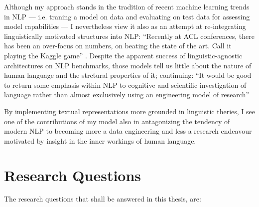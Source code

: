 Although my approach stands in the tradition of recent machine learning trends in NLP --- i.e.
traning a model on data and evaluating on test data for assessing model capabilities --- I
nevertheless view it also as an attempt at re-integrating linguistically motivated structures
into NLP: ``Recently at ACL conferences, there has been an over-focus on numbers, on beating the
state of the art. Call it playing the Kaggle game'' \citep[p.~702]{manning2015computational}.
Despite the apparent success of linguistic-agnostic architectures on NLP benchmarks, those
models tell us little about the nature of human language and the strctural properties of it;
\citeauthor{manning2015computational} continuing: ``It would be good to return some emphasis
within NLP to cognitive and scientific investigation of language rather than almost exclusively
using an engineering model of research'' \citep[p.~706]{manning2015computational}

By implementing textual representations more grounded in linguistic theries, I see one of the
contributions of my model also in antagonizing the tendency of modern NLP to becoming more a
data engineering and less a research endeavour motivated by insight in the inner workings
of human language.



\section{Research Questions}

The research questions that shall be answered in this thesis, are:

